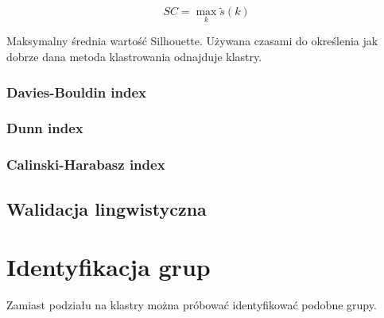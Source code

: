 \documentclass{article}
\begin{document}
\[ SC = \max_k \tilde{s}(k) \]

Maksymalny średnia wartość Silhouette. Używana czasami do określenia jak
dobrze dana metoda klastrowania odnajduje klastry.

\subsubsection{Davies-Bouldin index}

\subsubsection{Dunn index}

\subsubsection{Calinski-Harabasz index}

\subsection{Walidacja lingwistyczna}

\section{Identyfikacja grup}

Zamiast podziału na klastry można próbować identyfikować podobne grupy.
\end{document}
